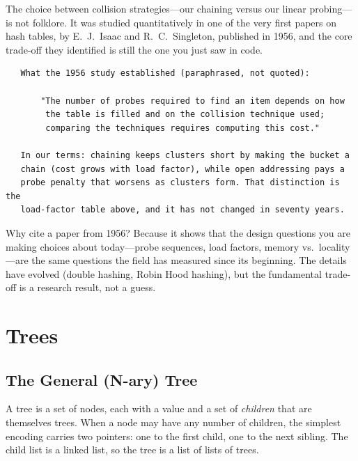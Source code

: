 \begin{researchnote}
The choice between collision strategies---our chaining versus our
linear probing---is not folklore. It was studied quantitatively in one
of the very first papers on hash tables, by E.~J.~Isaac and
R.~C.~Singleton, published in 1956, and the core trade-off they
identified is still the one you just saw in code.

\begin{verbatim}
   What the 1956 study established (paraphrased, not quoted):

       "The number of probes required to find an item depends on how
        the table is filled and on the collision technique used;
        comparing the techniques requires computing this cost."

   In our terms: chaining keeps clusters short by making the bucket a
   chain (cost grows with load factor), while open addressing pays a
   probe penalty that worsens as clusters form. That distinction is the
   load-factor table above, and it has not changed in seventy years.
\end{verbatim}

Why cite a paper from 1956? Because it shows that the design questions
you are making choices about today---probe sequences, load factors,
memory vs.\ locality---are the same questions the field has measured
since its beginning. The details have evolved (double hashing, Robin
Hood hashing), but the fundamental trade-off is a research result, not
a guess.

\end{researchnote}

\section{Trees}

\subsection{The General (N-ary) Tree}

A tree is a set of nodes, each with a value and a set of \emph{children}
that are themselves trees. When a node may have any number of children,
the simplest encoding carries two pointers: one to the first child, one
to the next sibling. The child list is a linked list, so the tree is a
list of lists of trees.

